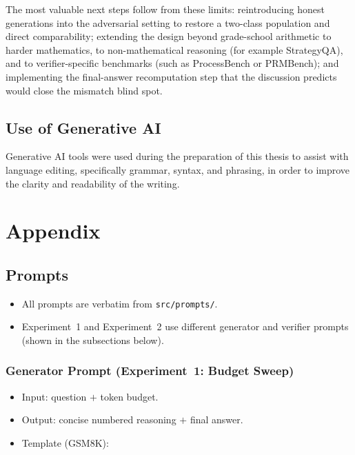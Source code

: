 \documentclass[12pt, a4paper, oneside]{report}
\begin{document}
The most valuable next steps follow from these limits: reintroducing honest generations into the adversarial 
setting to restore a two-class population and direct comparability; extending the design beyond grade-school 
arithmetic to harder mathematics, to non-mathematical reasoning (for example StrategyQA), and to verifier-specific 
benchmarks (such as ProcessBench or PRMBench); and implementing the final-answer recomputation step that the discussion
 predicts would close the mismatch blind spot.



\section*{Use of Generative AI}
 
Generative AI tools were used during the preparation of this thesis to assist with language editing,
 specifically grammar, syntax, and phrasing, in order to improve the clarity and readability of the writing.





\printbibliography[heading=bibnumbered, title={References}]



\chapter{Appendix}


\section{Prompts}
\label{sec:prompts}


\begin{itemize}
  \item All prompts are verbatim from \texttt{src/prompts/}.
  \item Experiment~1 and Experiment~2 use different generator and verifier prompts
  (shown in the subsections below).
\end{itemize}


\subsection{Generator Prompt (Experiment~1: Budget Sweep)}
\label{sec:gen-prompt-exp1}


\begin{itemize}
  \item Input: question $+$ token budget.
  \item Output: concise numbered reasoning $+$ final answer.
  \item Template (GSM8K):
\end{itemize}
\end{document}
